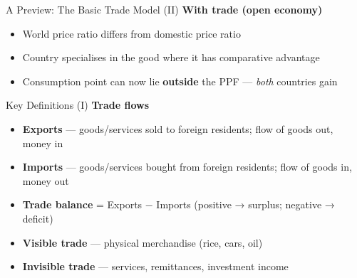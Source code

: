 \documentclass[
  ignorenonframetext,
  aspectratio=169,
]{beamer}
\makeatletter
\providecommand{\tightlist}{%
  \setlength{\itemsep}{0pt}\setlength{\parskip}{0pt}}
\let\quarto@originallabel\label
\DeclareRobustCommand*{\label}[1]{\quarto@originallabel{#1}}
\makeatother
\begin{document}
\begin{frame}{A Preview: The Basic Trade Model (II)}
\label{a-preview-the-basic-trade-model-ii}
\textbf{With trade (open economy)}

\begin{itemize}
\tightlist
\item
  World price ratio differs from domestic price ratio
\item
  Country specialises in the good where it has comparative advantage
\item
  Consumption point can now lie \textbf{outside} the PPF --- \emph{both}
  countries gain
\end{itemize}

\end{frame}

\begin{frame}{Key Definitions (I)}
\label{key-definitions-i}
\textbf{Trade flows}

\begin{itemize}
\tightlist
\item
  \textbf{Exports} --- goods/services sold to foreign residents; flow of
  goods out, money in
\item
  \textbf{Imports} --- goods/services bought from foreign residents;
  flow of goods in, money out
\item
  \textbf{Trade balance} = Exports − Imports (positive → surplus;
  negative → deficit)
\item
  \textbf{Visible trade} --- physical merchandise (rice, cars, oil)
\item
  \textbf{Invisible trade} --- services, remittances, investment income
\end{itemize}
\end{frame}
\end{document}
